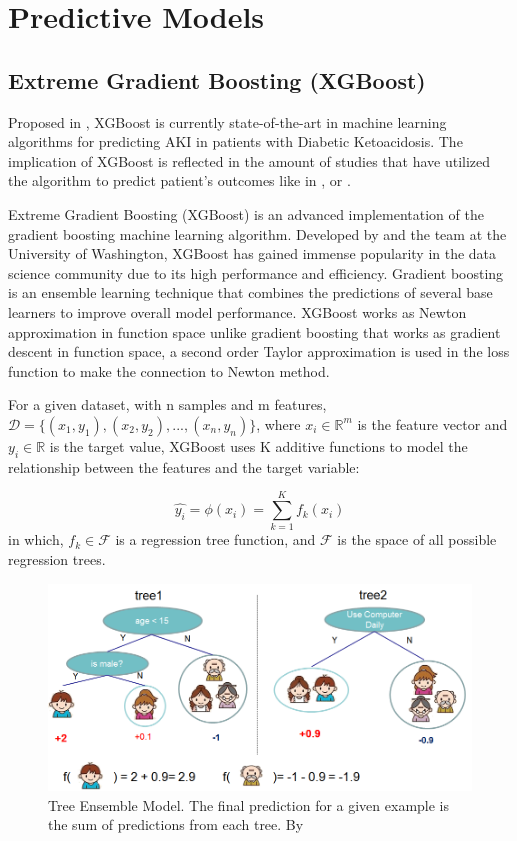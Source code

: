 \documentclass[../main.tex]{subfiles}
\begin{document}
\section{Predictive Models}


\subsection{Extreme Gradient Boosting (XGBoost)}

Proposed in , XGBoost is currently state-of-the-art in machine learning algorithms for predicting AKI in patients with Diabetic Ketoacidosis.
The implication of XGBoost is reflected in the amount of studies that have utilized the algorithm to predict patient's outcomes like in ,  or .

Extreme Gradient Boosting (XGBoost) is an advanced implementation of the gradient boosting machine learning algorithm.
Developed by \citeauthor{xgboost-source} and the team at the University of Washington, XGBoost has gained immense popularity in the data science community due to its high performance and efficiency.
Gradient boosting is an ensemble learning technique that combines the predictions of several base learners to improve overall model performance.
XGBoost works as Newton approximation in function space unlike gradient boosting that works as gradient descent in function space, a second order Taylor approximation is used in the loss function to make the connection to Newton method.

For a given dataset, with n samples and m features, $\mathcal{D} = \{(x_1, y_1), (x_2, y_2), ..., (x_n, y_n)\}$, where $x_i \in \mathbb{R}^m$ is the feature vector and $y_i \in \mathbb{R}$ is the target value, XGBoost uses K additive functions to model the relationship between the features and the target variable:

\begin{equation}
    \hat{y_i} = \phi(x_i) = \sum_{k=1}^K f_k(x_i)
\end{equation}
in which, $f_k \in \mathcal{F}$ is a regression tree function, and $\mathcal{F}$ is the space of all possible regression trees.

\begin{figure}
    \centering
    \includegraphics[width=.70\textwidth]{Figure/XGBoost_org_tree_model.png}
    \caption{Tree Ensemble Model. The final prediction for a given example is the sum of  predictions from each tree. By \citeauthor{xgboost-source}}
    \label{fig:treemodel}
\end{figure}
\end{document}
